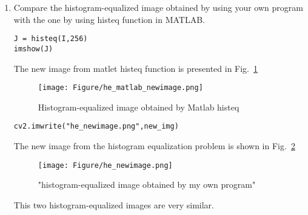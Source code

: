 \documentclass[12pt]{article}
\begin{document}
\begin{enumerate}[leftmargin=\labelsep]
\begin{enumerate}
                \item Compare the histogram-equalized image obtained by using your own program with the one by using histeq function in MATLAB.
\begin{lstlisting}
J = histeq(I,256)
imshow(J)
\end{lstlisting}
                The new image from matlet histeq function is presented in Fig.~\ref{q5_matlab_newimage}
                \begin{figure}[H]
                \centering
                \texttt{[image: Figure/he\_matlab\_newimage.png]}
                \caption{Histogram-equalized image obtained by Matlab histeq}
                \label{q5_matlab_newimage}
                \end{figure}
\begin{lstlisting}
cv2.imwrite("he_newimage.png",new_img)
\end{lstlisting}
                The new image from the histogram equalization problem is shown in Fig.~\ref{q5_python_newimage}
                \begin{figure}[H]
                \centering
                \texttt{[image: Figure/he\_newimage.png]}
                \caption{"histogram-equalized image obtained by my own program"}
                \label{q5_python_newimage}
                \end{figure}
                This two histogram-equalized images are very similar. 

                
        \end{enumerate}
\end{enumerate}
\end{document}
